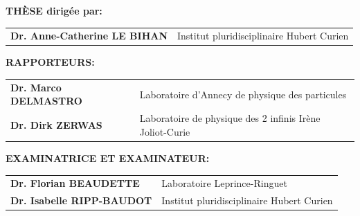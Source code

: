 \begin{titlepage}
\begin{center}
      \end{center}
      
       \small
      
       \vspace*{0.2cm}
      
       {\large \textbf{THÈSE dirigée par:}} %
      
       \vspace*{0.5cm}
      
       \setlength{\tabcolsep}{0.5cm}
       \begin{tabular}{ll}
             \textbf{Dr. Anne-Catherine LE BIHAN}          & Institut pluridisciplinaire Hubert Curien\\
       \end{tabular}
      
       \hrulefill
      
       \vspace*{0.5cm}
      
      
      
      
             {\large \textbf{RAPPORTEURS:}} %
      
             \vspace*{0.5cm}
      
             \setlength{\tabcolsep}{.5cm}
             \begin{tabular}{ll}
                   \textbf{Dr. Marco DELMASTRO} & Laboratoire d'Annecy de physique des particules\\
                   \textbf{Dr. Dirk ZERWAS} & Laboratoire de physique des 2 infinis Irène Joliot-Curie \\
             \end{tabular}
      
             \vspace*{0.8cm}
      
             {\large \textbf{EXAMINATRICE ET EXAMINATEUR:}} %
      
             \vspace*{0.5cm}
      
             \setlength{\tabcolsep}{0.5cm}
             \begin{tabular}{ll}
                  \textbf{Dr. Florian BEAUDETTE}          &  Laboratoire Leprince-Ringuet\\
                  \textbf{Dr. Isabelle RIPP-BAUDOT}          & Institut pluridisciplinaire Hubert Curien\\

             \end{tabular}
      
      
      
      \end{titlepage}